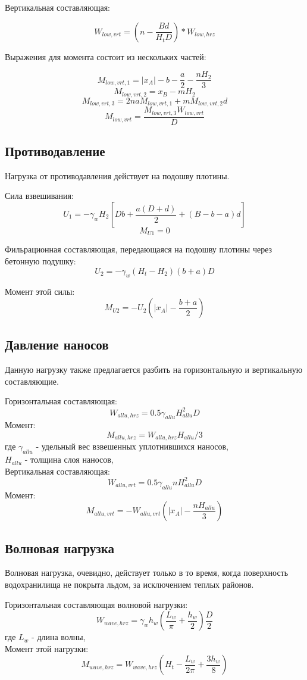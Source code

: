 \documentclass[12pt,a4paper,oneside,draft,titlepage]{article}
\begin{document}
Вертикальная составляющая:

$$ W_{low,vrt} = (n - \frac{B  d}{H_t  D}) * W_{low,hrz} $$
 
Выражения для момента состоит из нескольких частей:

$$ M_{low,vrt,1} = |x_A| - b - \frac{a}{2} - \frac{n  H_2}{3} $$
$$ M_{low,vrt,2} = x_B - m  H_2 $$
$$ M_{low,vrt,3} = 2  n  a  M_{low,vrt,1} + m  M_{low,vrt,2}  d $$
$$ M_{low,vrt} = \frac{M_{low,vrt,3}  W_{low,vrt}}{D} $$

\subsection{Противодавление}
Нагрузка от противодавления действует на подошву плотины.

Сила взвешивания:
$$ U_1 = -\gamma_w  H_2  [D  b + \frac{a  (D + d) }{2} + (B - b - a) d] $$
$$ M_{U1} = 0 $$

Фильрационная составляющая, передающаяся на подошву плотины через бетонную подушку:
$$ U_2 = -\gamma_w (H_t - H_2)  (b + a)  D $$

Момент этой силы:
$$ M_{U2} = -U_2  (|x_A| - \frac{b + a}{2}) $$

\subsection{Давление наносов}

Данную нагрузку также предлагается разбить на горизонтальную и вертикальную составляющие.

Горизонтальная составляющая:
$$ W_{allu,hrz} = 0.5  \gamma_{allu}  H_{allu} ^ 2  D $$
Момент:
$$ M_{allu,hrz} = W_{allu,hrz}  H_{allu} / 3 $$
где $\gamma_{allu}$ - удельный вес взвешенных уплотнившихся наносов,\\
$H_{allu}$ - толщина слоя наносов,\\

Вертикальная составляющая:
$$ W_{allu,vrt} = 0.5  \gamma_{allu}  n  H_{allu} ^ 2  D $$
Момент:
$$ M_{allu,vrt} = -W_{allu,vrt}(|x_A| - \frac{n  H_{allu}}{3}) $$

\subsection{Волновая нагрузка}

Волновая нагрузка, очевидно, действует только в то время, когда поверхность водохранилища не покрыта льдом, за исключением теплых районов.

Горизонтальная составляющая волновой нагрузки:
$$ W_{wave,hrz} = \gamma_w  h_w  (\frac{L_w}{\pi}  + \frac{h_w}{2}) \frac{D}{2} $$
где $L_w$ - длина волны,\\
Момент этой нагрузки:
$$ M_{wave,hrz} = W_{wave,hrz}  (H_t - \frac{L_w }{ 2  \pi} + \frac{3 h_w}{8}) $$
\end{document}
